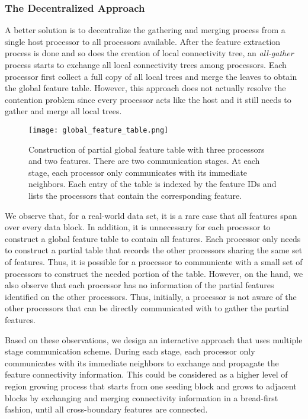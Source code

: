 \subsubsection{The Decentralized Approach}
\label{sec:decentralized}

A better solution is to decentralize the gathering and merging process from a single host processor to all processors available. After the feature extraction process is done and so does the creation of local connectivity tree, an \emph{all-gather} process starts to exchange all local connectivity trees among processors. Each processor first collect a full copy of all local trees and merge the leaves to obtain the global feature table. However, this approach does not actually resolve the contention problem since every processor acts like the host and it still needs to gather and merge all local trees. 

\begin{figure}[t]
	\centering
	\texttt{[image: global\_feature\_table.png]}
	\caption{Construction of partial global feature table with three processors and two features. There are two communication stages. At each stage, each processor only communicates with its immediate neighbors. Each entry of the table is indexed by the feature IDs and lists the processors that contain the corresponding feature.}
	\label{fig:global_table}
\end{figure}

We observe that, for a real-world data set, it is a rare case that all features span over every data block. In addition, it is unnecessary for each processor to construct a global feature table to contain all features. Each processor only needs to construct a partial table that records the other processors sharing the same set of features. Thus, it is possible for a processor to communicate with a small set of processors to construct the needed portion of the table. However, on the hand, we also observe that each processor has no information of the partial features identified on the other processors. Thus, initially, a processor is not aware of the other processors that can be directly communicated with to gather the partial features. 

Based on these observations, we design an interactive approach that uses multiple stage communication scheme. During each stage, each processor only communicates with its immediate neighbors to exchange and propagate the feature connectivity information. This could be considered as a higher level of region growing process that starts from one seeding block and grows to adjacent blocks by exchanging and merging connectivity information in a bread-first fashion, until all cross-boundary features are connected. 

